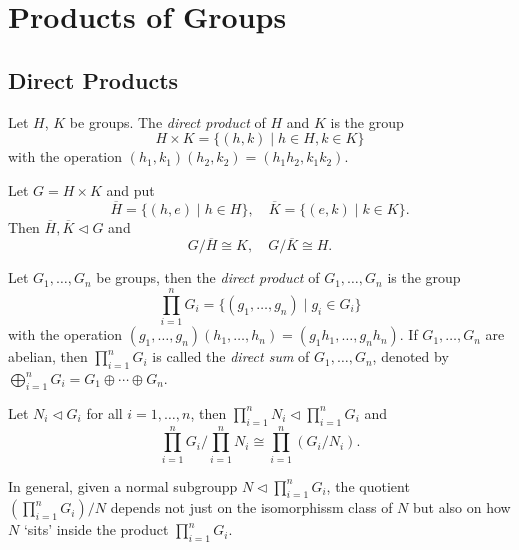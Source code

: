 \chapter{Products of Groups}

\section{Direct Products}
\begin{definition}
  Let \(H\), \(K\) be groups. The \emph{direct product} of \(H\) and \(K\) is the group \[
    H\times K = \{(h,k) \mid h\in H, k\in K\}
  \] with the operation \((h_1,k_1)(h_2,k_2) = (h_1h_2, k_1k_2)\).
\end{definition}

\begin{proposition}
  Let \(G = H\times K\) and put \[
    \overline{H} = \{(h,e) \mid h\in H\}, \quad
    \overline{K} = \{(e,k) \mid k\in K\}.
  \]
  Then \(\overline{H},\overline{K}\lhd G\) and \[
    G/\overline{H} \cong K, \quad
    G/\overline{K} \cong H.
  \]
\end{proposition}

\begin{definition}
  Let \(G_1,\ldots,G_n\) be groups, then the \emph{direct product} of \(G_1,\ldots,G_n\) is the group \[
    \prod_{i=1}^n G_i = \{(g_1,\ldots,g_n) \mid g_i\in G_i\}
  \] with the operation \((g_1,\ldots,g_n)(h_1,\ldots,h_n) = (g_1h_1,\ldots,g_nh_n)\).
  If \(G_1,\ldots,G_n\) are abelian, then \(\prod_{i=1}^n G_i\) is called the \emph{direct sum} of \(G_1,\ldots,G_n\), denoted by \(\bigoplus_{i=1}^n G_i = G_1\oplus\cdots\oplus G_n\).
\end{definition}

\begin{proposition}
  Let \(N_i\lhd G_i\) for all \(i = 1,\ldots,n\), then \(\prod_{i=1}^n N_i \lhd \prod_{i=1}^n G_i\) and \[
    \prod_{i=1}^n G_i\Bigg/\prod_{i=1}^n N_i \cong \prod_{i=1}^n (G_i/N_i).
  \]
\end{proposition}

In general, given a normal subgroupp \(N\lhd\prod_{i=1}^n G_i\), the quotient \((\prod_{i=1}^n G_i)/N\) depends not just on the isomorphissm class of \(N\) but also on how \(N\) `sits' inside the product \(\prod_{i=1}^n G_i\).

